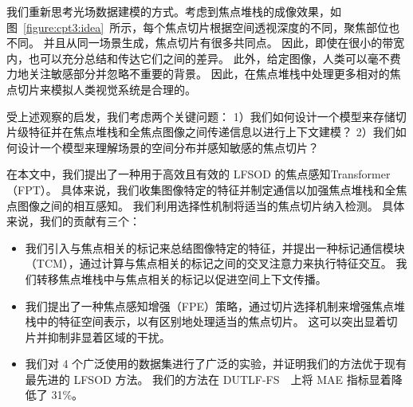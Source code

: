 我们重新思考光场数据建模的方式。考虑到焦点堆栈的成像效果，如图~\ref{figure:cpt3:idea}~所示，每个焦点切片根据空间透视深度的不同，聚焦部位也不同。 并且从同一场景生成，焦点切片有很多共同点。
因此，即使在很小的带宽内，也可以充分总结和传达它们之间的差异。 此外，给定图像，人类可以毫不费力地关注敏感部分并忽略不重要的背景。 因此，在焦点堆栈中处理更多相对的焦点切片来模拟人类视觉系统是合理的。 


受上述观察的启发，我们考虑两个关键问题：
1）我们如何设计一个模型来存储切片级特征并在焦点堆栈和全焦点图像之间传递信息以进行上下文建模？ 
2）我们如何设计一个模型来理解场景的空间分布并感知敏感的焦点切片？ 

在本文中，我们提出了一种用于高效且有效的 LFSOD 的焦点感知Transformer（FPT）。 具体来说，我们收集图像特定的特征并制定通信以加强焦点堆栈和全焦点图像之间的相互感知。 我们利用选择性机制将适当的焦点切片纳入检测。 具体来说，我们的贡献有三个：



\begin{itemize}
	\item 我们引入与焦点相关的标记来总结图像特定的特征，并提出一种标记通信模块（TCM），通过计算与焦点相关的标记之间的交叉注意力来执行特征交互。 我们转移焦点堆栈中与焦点相关的标记以促进空间上下文传播。 
	
	\item 我们提出了一种焦点感知增强（FPE）策略，通过切片选择机制来增强焦点堆栈中的特征空间表示，以有区别地处理适当的焦点切片。	这可以突出显着切片并抑制非显着区域的干扰。 
	
	\item 我们对 4 个广泛使用的数据集进行了广泛的实验，并证明我们的方法优于现有最先进的 LFSOD 方法。 我们的方法在 DUTLF-FS~\cite{zhang2019memory}~上将 MAE 指标显着降低了 31\%。
\end{itemize}







